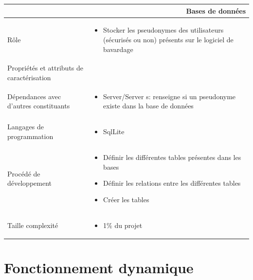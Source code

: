 \documentclass[a4paper,11pt,french]{article}
\begin{document}
\begin{center}
	\vspace*{0.7cm}
	\begin{tabularx}{16cm}{|l|X|}
	\hline
	\multicolumn{2}{|r|}{\textbf{Bases de données}}\\
	\hline
	R\^ole &  \begin{itemize}\item Stocker les pseudonymes des utilisateurs (sécurisés ou non) présents sur le logiciel de bavardage
 \end{itemize}\\
	\hline
	Propriétés et attributs de caractérisation & \\
	\hline
	Dépendances avec d'autres constituants & \begin{itemize}\item Server/Server s: renseigne si un pseudonyme existe dans la base de données \end{itemize} \\
	\hline
	Langages de programmation & \begin{itemize} \item SqlLite \end{itemize}\\
	\hline
	Procédé de développement & \begin{itemize}\item Définir les différentes tables présentes dans les bases \item Définir les relations entre les différentes tables \item Créer les tables \end{itemize}\\
	\hline
	Taille complexité & \begin{itemize}\item 1\% du projet \end{itemize}\\
	\hline
	\end{tabularx}
\end{center}


\section{Fonctionnement dynamique}
\end{document}

